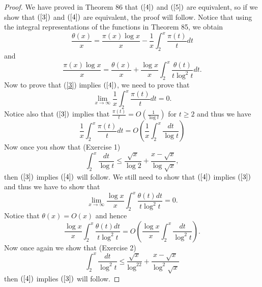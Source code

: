 \documentclass[12pt,letterpaper]{book}
\begin{document}
\begin{proof}
We have proved in Theorem 86 that $(\ref{4})$ and $(\ref{5})$ are
equivalent, so if we show that $(\ref{3})$ and $(\ref{4})$ are
equivalent, the proof will follow.  Notice that using the integral
representations of the functions in Theorem 85, we obtain
\begin{equation*}
\frac{\theta(x)}{x}=\frac{\pi(x)\log x}{x}-\frac{1}{x}\int_
{2}^{x}\frac{\pi(t)}{t}dt
\end{equation*}
and
\begin{equation*}
 \frac{\pi(x)\log x}{x}=\frac{\theta(x)}{x}+\frac{\log x}{x}\int_{2}^x\frac{\theta(t)}{t\log^2t}dt.
 \end{equation*}
Now to prove that (\ref{3}) implies $(\ref{4})$, we need to prove
that
\begin{equation*}
\lim_{x\rightarrow \infty}\frac{1}{x}\int_
{2}^{x}\frac{\pi(t)}{t}dt=0.
\end{equation*}
Notice also that $(\ref{3})$ implies that
$\frac{\pi(t)}{t}=O\left(\frac{1}{\log t}\right)$ for $t\geq 2$ and
thus we have
\begin{equation*}
\frac{1}{x}\int_
{2}^{x}\frac{\pi(t)}{t}dt=O\left(\frac{1}{x}\int_2^x\frac{dt}{\log
t}\right)
\end{equation*}
Now once you show that (Exercise 1)
\begin{equation*}
\int_2^x\frac{dt}{\log t}\leq \frac{\sqrt{x}}{\log
2}+\frac{x-\sqrt{x}}{\log \sqrt{x}},
\end{equation*}
then $(\ref{3})$ implies $(\ref{4})$ will follow. We still need to
show that $(\ref{4})$ implies $(\ref{3})$ and thus we have to show
that
\begin{equation*}
\lim_{x\rightarrow \infty}\frac{\log x}{x}\int_{2}^x
\frac{\theta(t)dt}{t\log^2t}=0.
\end{equation*}
Notice that $\theta(x)=O(x)$ and hence
\begin{equation*}
\frac{\log x}{x}\int_{2}^x
\frac{\theta(t)dt}{t\log^2t}=O\left(\frac{\log
x}{x}\int_2^x\frac{dt}{\log^2t}\right).
\end{equation*}
Now once again we show that (Exercise 2)
\begin{equation*}
\int_2^x\frac{dt}{\log^2t}\leq
\frac{\sqrt{x}}{\log^22}+\frac{x-\sqrt{x}}{\log^2\sqrt{x}}
\end{equation*}
then $(\ref{4})$ implies $(\ref{3})$ will follow.

\end{proof}
\end{document}
